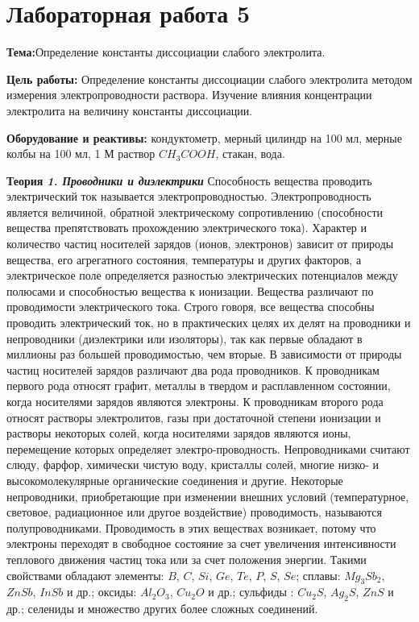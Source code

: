 \section{Лабораторная работа 5 }
\textbf{Тема:}Определение константы диссоциации слабого электролита.

\textbf{Цель работы:} Определение константы диссоциации слабого электролита методом измерения электропроводности раствора. Изучение влияния концентрации электролита на величину константы диссоциации.

\textbf{Оборудование и реактивы:} кондуктометр, мерный цилиндр на 100 мл, мерные колбы на 100 мл, 1 М раствор $CH_{3}COOH$, стакан, вода.

\textbf{Теория}
\textit{\textbf{1. Проводники и диэлектрики}}
Способность вещества  проводить  электрический  ток  называется электропроводностью. Электропроводность является величиной, обратной электрическому сопротивлению (способности вещества препятствовать прохождению электрического тока).  Характер и количество частиц носителей зарядов (ионов,  электронов) зависит от природы вещества,  его агрегатного состояния, температуры и других факторов, а электрическое поле определяется разностью электрических потенциалов между полюсами и способностью вещества к ионизации.  Вещества различают по проводимости электрического тока.  Строго говоря, все вещества способны проводить электрический ток,  но в практических целях их делят на проводники и непроводники (диэлектрики или  изоляторы),  так как первые обладают в миллионы раз большей проводимостью,  чем вторые. В зависимости от природы частиц носителей зарядов  различают два рода проводников.  К проводникам первого рода относят графит, металлы в твердом и расплавленном состоянии, когда носителями зарядов являются электроны.
К проводникам второго рода относят растворы электролитов,  газы при достаточной степени ионизации и растворы некоторых солей, когда носителями зарядов являются ионы, перемещение которых определяет электро-проводность. Непроводниками считают слюду, фарфор, химически чистую воду,  кристаллы солей, многие низко- и высокомолекулярные  органические соединения и другие.  Некоторые непроводники, приобретающие при изменении внешних условий (температурное, световое, радиационное или другое воздействие) проводимость, называются полупроводниками.  Проводимость в этих веществах возникает, потому что  электроны  переходят в свободное состояние за счет увеличения интенсивности теплового движения частиц тока или за счет положения энергии.  Такими свойствами обладают элементы:  $B$, $C$, $Si$, $Ge$, $Te$, $P$, $S$, $Se$; сплавы: $Mg_{3}Sb_{2}$, $ZnSb$, $InSb$ и др.; оксиды: $Al_{2}O_{3}$, $Cu_{2}O$ и др.; сульфиды : $Cu_{2}S$, $Ag_{2}S$, $ZnS$ и др.; селениды и множество других более сложных соединений.

